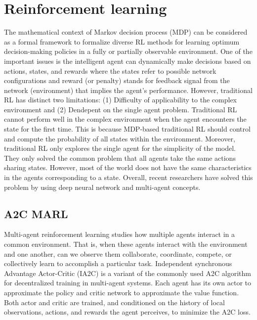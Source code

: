 \documentclass[conference]{IEEEtran}
\begin{document}
\section{Reinforcement learning}
The mathematical context of Markov decision process (MDP) can be considered as a formal framework to formalize diverse RL methods for learning optimum decision-making policies in a fully or partially observable environment. One of the important issues is the intelligent agent can dynamically make decisions based on actions, states, and rewards where the states refer to possible network configurations and reward (or penalty) stands for feedback signal from the network (environment) that implies the agent’s performance. However, traditional RL has distinct two limitations: (1) Difficulty of applicability to the complex environment and (2) Dendepent on the single agent problem. Traditional RL cannot perform well in the complex environment when the agent encounters the state for the first time. This is because MDP-based traditional RL should control and compute the probability of all states within the environment. Moreover, traditional RL only explores the single agent for the simplicity of the model. They only solved the common problem that all agents take the same actions sharing states. However, most of the world does not have the same characteristics in the agents corresponding to a state. Overall, recent researchers have solved this problem by using deep neural network and multi-agent concepts. 

\subsection{A2C MARL}
Multi-agent reinforcement learning studies how multiple agents interact in a common environment. That is, when these agents interact with the environment and one another, can we observe them collaborate, coordinate, compete, or collectively learn to accomplish a particular task. Independent synchronous Advantage Actor-Critic (IA2C) is a variant of the commonly used A2C algorithm for decentralized training in multi-agent systems. Each agent has its own actor to approximate the policy and critic network to approximate the value function. Both actor and critic are trained, and conditioned on the history of local observations, actions, and rewards the agent perceives, to minimize the A2C loss. 
\end{document}

